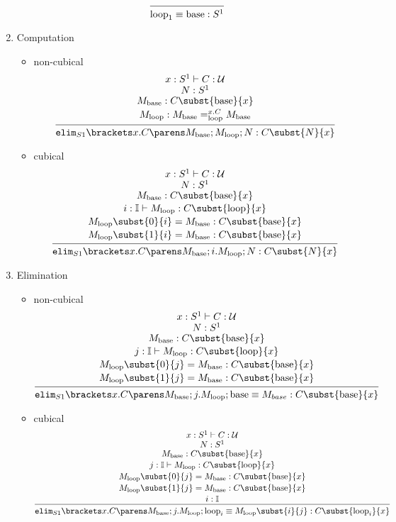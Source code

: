\documentclass[11pt]{article}
\begin{document}
\begin{enumerate}
\[
    \begin{prooftree}
        \infer0{\oftype{\eqtype{\loops_1}{\base}}{S^1}}
    \end{prooftree}
\]
    \item Computation
        \begin{itemize}
            \item non-cubical
\[
    \begin{prooftree}
        \hypo{\oftype{\oftype{x}{S^1}}{C}{\UU}}
        \infer[no rule]1{\oftype{N}{S^1}}
        \infer[no rule]1{\oftype{M_{\base}}{C\subst{\base}{x}}}
        \infer[no rule]1{\oftype{M_{\loops}}{M_{\base}=_{\loops}^{x.C}M_{\base}}}
        \infer1{\oftype{\circase{S1}{x}{C}{M_{\base}}{M_{\loops}}{N}}{C\subst{N}{x}}}
    \end{prooftree}
\]
            \item cubical
\[
    \begin{prooftree}
        \hypo{\oftype{\oftype{x}{S^1}}{C}{\UU}}
        \infer[no rule]1{\oftype{N}{S^1}}
        \infer[no rule]1{\oftype{M_{\base}}{C\subst{\base}{x}}}
        \infer[no rule]1{\oftype{i:\bI}{M_{\loops}}{C\subst{\loops}{x}}}
        \infer[no rule]1{\oftype{M_{\loops}\subst{0}{i}=M_{\base}}{C\subst{\base}{x}}}
        \infer[no rule]1{\oftype{M_{\loops}\subst{1}{i}=M_{\base}}{C\subst{\base}{x}}}
        \infer1{\oftype{\circase{S1}{x}{C}{M_{\base}}{i.M_{\loops}}{N}}{C\subst{N}{x}}}
    \end{prooftree}
\]
        \end{itemize}
    \item Elimination
        \begin{itemize}
            \item non-cubical
\[
    \begin{prooftree}
        \hypo{\oftype{\oftype{x}{S^1}}{C}{\UU}}
        \infer[no rule]1{\oftype{N}{S^1}}
        \infer[no rule]1{\oftype{M_{\base}}{C\subst{\base}{x}}}
        \infer[no rule]1{\oftype{j:\bI}{M_{\loops}}{C\subst{\loops}{x}}}
        \infer[no rule]1{\oftype{M_{\loops}\subst{0}{j}=M_{\base}}{C\subst{\base}{x}}}
        \infer[no rule]1{\oftype{M_{\loops}\subst{1}{j}=M_{\base}}{C\subst{\base}{x}}}
        \infer1{\oftype{\eqtype{\circase{S1}{x}{C}{M_{\base}}{j.M_{\loops}}{\base}}{M_{base}}}{C\subst{\base}{x}}}
    \end{prooftree}
\]
            \item cubical
\[
    \begin{prooftree}
        \hypo{\oftype{\oftype{x}{S^1}}{C}{\UU}}
        \infer[no rule]1{\oftype{N}{S^1}}
        \infer[no rule]1{\oftype{M_{\base}}{C\subst{\base}{x}}}
        \infer[no rule]1{\oftype{j:\bI}{M_{\loops}}{C\subst{\loops}{x}}}
        \infer[no rule]1{\oftype{M_{\loops}\subst{0}{j}=M_{\base}}{C\subst{\base}{x}}}
        \infer[no rule]1{\oftype{M_{\loops}\subst{1}{j}=M_{\base}}{C\subst{\base}{x}}}
        \infer[no rule]1{\oftype{i}{\bI}}
        \infer1{\oftype{\eqtype{\circase{S1}{x}{C}{M_{\base}}{j.M_{\loops}}{\loops_i}}{M_{\loops}\subst{i}{j}}}{C\subst{\loops_i}{x}}}
    \end{prooftree}
\]
        \end{itemize}
\end{enumerate}
\end{document}
